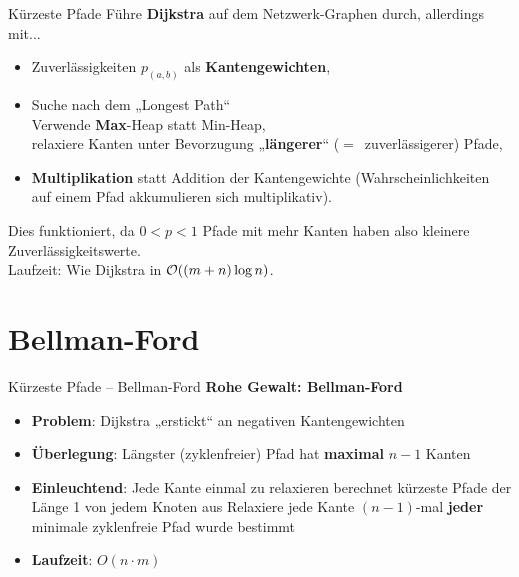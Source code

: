 \begin{frame}{Kürzeste Pfade}
	\solutionheading
	Führe \textbf{Dijkstra} auf dem Netzwerk-Graphen durch, allerdings mit...
	\begin{itemize}
		\item Zuverlässigkeiten $p_{(a,b)}$ als \textbf{Kantengewichten},
		\item Suche nach dem „Longest Path“ \\
		\impl Verwende \textbf{Max}-Heap statt Min-Heap, \\
		\impl relaxiere Kanten unter Bevorzugung „\textbf{längerer}“ {\small ($=$~zuverlässigerer)} Pfade,
		\item \textbf{Multiplikation} statt Addition der Kantengewichte (Wahrscheinlichkeiten auf einem Pfad akkumulieren sich multiplikativ).
	\end{itemize}
	\pause
	Dies funktioniert, da $ 0 < p < 1$ \impl Pfade mit mehr Kanten haben also kleinere Zuverlässigkeitswerte. \\
	\pause
	\smallskip
	Laufzeit: Wie Dijkstra in $\mathcal{O}\!\left((m+n) \log n\right)$.
\end{frame}

\section{Bellman-Ford}

\begin{frame}{Kürzeste Pfade – Bellman-Ford}
	\textbf{Rohe Gewalt: Bellman-Ford} 
	\begin{itemize}
		\item \textbf{Problem}: Dijkstra „erstickt“ an negativen Kantengewichten
		\pause
		\item \textbf{Überlegung}: Längster (zyklenfreier) Pfad hat \textbf{maximal} $n-1$ Kanten
		\item \textbf{Einleuchtend}: Jede Kante einmal zu relaxieren berechnet kürzeste Pfade der Länge 1 von jedem Knoten aus
		\pause
		\implitem Relaxiere jede Kante $(n-1)$-mal \impl \textbf{jeder} minimale zyklenfreie Pfad wurde bestimmt
		\pause
		\item \textbf{Laufzeit}: $O(n \cdot m)$
	\end{itemize}
\end{frame}

